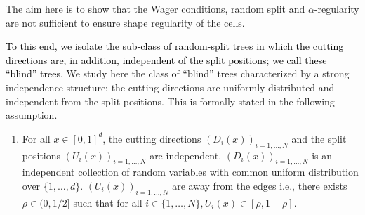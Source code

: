 \documentclass[paper=a4, fontsize=11pt]{scrartcl}
\newcommand{\rev}[1]{\textcolor{black}{#1}}
\begin{document}

The aim here is to show that the Wager conditions, random split and $\alpha$-regularity are not sufficient to ensure shape regularity of the cells. 

\rev{To this end, we isolate the sub-class of random-split trees in which the cutting directions are, in addition, independent of the split positions; we call these ``blind'' trees.} We study here the class of ``blind'' trees characterized by a strong independence structure: the cutting directions are uniformly distributed and independent from the split positions. This is formally stated in the following assumption. 



\begin{enumerate}[label=(BL), wide=0.5em,  leftmargin=*]
\item \label{cond:indep_split_position} For all $x\in [0,1]^d$, the cutting directions $(D_i(x))_{i=1,\dots,N}$ and the split positions $(U_i(x))_{i=1,\dots,N}$ are independent. $(D_i(x))_{i=1,\dots,N}$ is an independent collection of random variables with common uniform distribution over $\{1, \dots, d\}$. $(U_i(x))_{i=1,\dots,N}$ are away from the edges i.e., there exists $\rho \in (0,1/2]$ such that for all $i \in \{ 1,\dots,N\},  U_i(x) \in  [\rho, 1-\rho]$. 
\end{enumerate}
\end{document}
